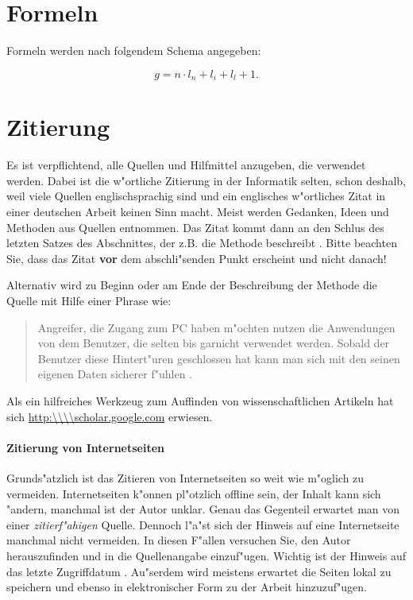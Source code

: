 \section{Formeln}
\label{sec:Formeln}

Formeln werden nach folgendem Schema angegeben:

\begin{equation}
g = n\cdot l_n + l_i + l_l + 1.
\label{gle:Laenge}
\end{equation}



\section{Zitierung}\label{zitierung}

Es ist verpflichtend, alle Quellen und Hilfmittel anzugeben, die verwendet werden.
Dabei ist die w"ortliche Zitierung in der Informatik selten, schon deshalb, weil viele Quellen englischsprachig sind und ein englisches w"ortliches Zitat in einer deutschen Arbeit keinen Sinn macht.
Meist werden Gedanken, Ideen und Methoden aus Quellen entnommen.
Das Zitat kommt dann an den Schlus des letzten Satzes des Abschnittes, der z.B. die Methode beschreibt \cite{wissentschaftlichesArbeitMitLatex}.
Bitte beachten Sie, dass das Zitat \textbf{vor} dem abschli"senden Punkt erscheint und nicht danach!

Alternativ wird zu Beginn oder am Ende der Beschreibung der Methode die Quelle mit Hilfe einer Phrase wie:
\begin{quote}
Angreifer, die Zugang zum PC haben m"ochten nutzen die Anwendungen von dem Benutzer, die selten bis garnicht verwendet werden. Sobald der Benutzer diese Hintert"uren geschlossen hat kann man sich mit den seinen eigenen Daten sicherer f"uhlen \cite{ctWindowsEinfachAbsichern}.
\end{quote}


Als ein hilfreiches Werkzeug zum Auffinden von wissenschaftlichen Artikeln hat sich \url{http:\\\\scholar.google.com} erwiesen.

\paragraph{Zitierung von Internetseiten}
Grunds"atzlich ist das Zitieren von Internetseiten so weit wie m"oglich zu vermeiden.
Internetseiten k"onnen pl"otzlich offline sein, der Inhalt kann sich "andern, manchmal ist der Autor unklar.
Genau das Gegenteil erwartet man von einer \emph{zitierf"ahigen} Quelle.
Dennoch l"a"st sich der Hinweis auf eine Internetseite manchmal nicht vermeiden.
In diesen F"allen versuchen Sie, den Autor herauszufinden und in die Quellenangabe einzuf"ugen.
Wichtig ist der Hinweis auf das letzte Zugriffdatum \cite{zitieren13}.
Au"serdem wird meistens erwartet die Seiten lokal zu speichern und ebenso in elektronischer Form zu der Arbeit hinzuzuf"ugen.

